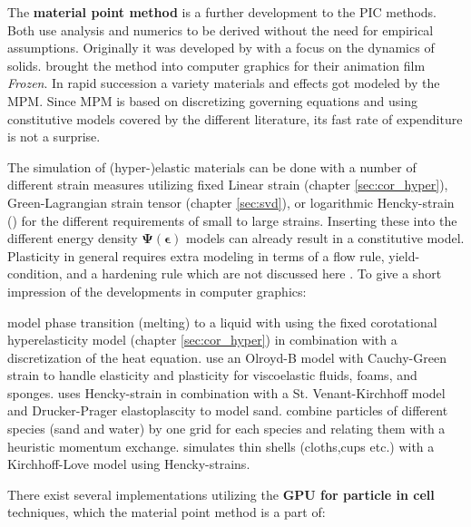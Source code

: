 \documentclass[m,times]{cgMA}
\begin{document}
The \textbf{material point method} is a further development to the PIC methods. Both use analysis and numerics to be derived without the need for empirical assumptions. Originally it was developed by \cite{sulsky1995application} with a focus on the dynamics of solids. \cite{MPM:SNOW} brought the method into computer graphics for their animation film \textit{Frozen}. In rapid succession a variety materials and effects got modeled by the MPM. Since MPM is based on discretizing governing equations and using constitutive models covered by the different literature, its fast rate of expenditure is not a surprise.

The simulation of (hyper-)elastic materials can be done with a number of different strain measures utilizing fixed Linear strain (chapter \ref{sec:cor_hyper}), Green-Lagrangian strain tensor (chapter \ref{sec:svd}), or logarithmic Hencky-strain (\cite{MPM:SHELLS}) for the different requirements of small to large strains. Inserting these into the different energy density $\boldsymbol{\Psi}(\boldsymbol{\epsilon})$ models can already result in a constitutive model. Plasticity in general requires extra modeling in terms of a flow rule, yield-condition, and a hardening rule which are not discussed here \cite{ochsner2014elasto}. To give a short impression of the developments in computer graphics:

\cite{MPM:PHASE_CHANGE} model phase transition (melting) to a liquid with using the fixed corotational hyperelasticity model (chapter \ref{sec:cor_hyper}) in combination with a discretization of the heat equation. \cite{MPM:OLROYDB} use an Olroyd-B model with Cauchy-Green strain to handle elasticity and plasticity for viscoelastic fluids, foams, and sponges. \cite{MPM:DRUCKER} uses Hencky-strain in combination with a St. Venant-Kirchhoff model and Drucker-Prager elastoplascity to model sand.
\cite{MPM:MULTI} combine particles of different species (sand and water) by one grid for each species and relating them with a heuristic momentum exchange. \cite{MPM:SHELLS} simulates thin shells (cloths,cups etc.) with a Kirchhoff-Love model using Hencky-strains.

There exist several implementations utilizing the \textbf{GPU for particle in cell} techniques, which the material point method is a part of:
\end{document}
